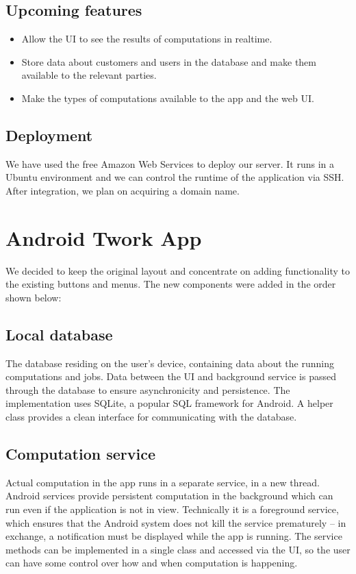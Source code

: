 \documentclass[a4paper,10pt]{article}
\begin{document}
\subsection{Upcoming features}

\begin{itemize}
\item Allow the UI to see the results of computations in realtime.
\item Store data about customers and users  in the database and make them available to the relevant parties.
\item Make the types of computations available to the app and the web UI.
\end{itemize}

\subsection{Deployment}
We have used the free Amazon Web Services to deploy our server. It runs in a Ubuntu environment and we can control the runtime of the application via SSH.
After integration, we plan on acquiring a domain name.




\section{Android Twork App}


We decided to keep the original layout and concentrate on adding functionality to the existing buttons and menus. The new components were added in the order shown below:

\subsection{Local database} The database residing on the user's device, containing data about the running computations and jobs. Data between the UI and background service is passed through the database to ensure asynchronicity and persistence. The implementation uses SQLite, a popular SQL framework for Android. A helper class provides a clean interface for communicating with the database.
\subsection{Computation service} Actual computation in the app runs in a separate service, in a new thread. Android services provide persistent computation in the background which can run even if the application is not in view. Technically it is a foreground service, which ensures that the Android system does not kill the service prematurely -- in exchange, a notification must be displayed while the app is running. The service methods can be implemented in a single class and accessed via the UI, so the user can have some control over how and when computation is happening.
\end{document}
